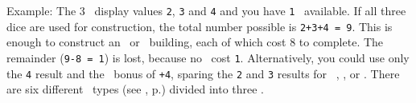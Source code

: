 Example: The 3 \whitedice\ display values \texttt{2}, \texttt{3} and \texttt{4} and you have \texttt{1} \greatperson\ available.  If all three dice are used for construction, the total number possible is \texttt{2+3+4 = 9}.  This is enough to construct an \academy\ or \factory\ building, each of which cost 8 to complete.  The remainder (\texttt{9-8 = 1}) is lost, because no \fortifications\ cost \texttt{1}.  Alternatively, you could use only the \texttt{4} result and the \greatperson\ bonus of \texttt{+4}, sparing the \texttt{2} and \texttt{3} results for \activating\ \fortifications, \trade, or \culture.
\newline\newline
There are six different \fortification\ types (see , p.\pageref{sec:fortifications}) divided into three \levels.
